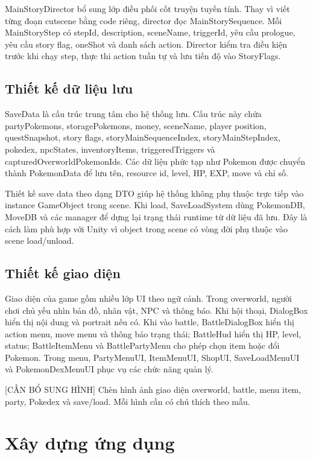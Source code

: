 MainStoryDirector bổ sung lớp điều phối cốt truyện tuyến tính. Thay vì viết từng đoạn cutscene bằng code riêng, director đọc MainStorySequence. Mỗi MainStoryStep có stepId, description, sceneName, triggerId, yêu cầu prologue, yêu cầu story flag, oneShot và danh sách action. Director kiểm tra điều kiện trước khi chạy step, thực thi action tuần tự và lưu tiến độ vào StoryFlags.

\subsection{Thiết kế dữ liệu lưu}

SaveData là cấu trúc trung tâm cho hệ thống lưu. Cấu trúc này chứa partyPokemons, storagePokemons, money, sceneName, player position, questSnapshot, story flags, storyMainSequenceIndex, storyMainStepIndex, pokedex, npcStates, inventoryItems, triggeredTriggers và capturedOverworldPokemonIds. Các dữ liệu phức tạp như Pokemon được chuyển thành PokemonData để lưu tên, resource id, level, HP, EXP, move và chỉ số.

Thiết kế save data theo dạng DTO giúp hệ thống không phụ thuộc trực tiếp vào instance GameObject trong scene. Khi load, SaveLoadSystem dùng PokemonDB, MoveDB và các manager để dựng lại trạng thái runtime từ dữ liệu đã lưu. Đây là cách làm phù hợp với Unity vì object trong scene có vòng đời phụ thuộc vào scene load/unload.

\subsection{Thiết kế giao diện}

Giao diện của game gồm nhiều lớp UI theo ngữ cảnh. Trong overworld, người chơi chủ yếu nhìn bản đồ, nhân vật, NPC và thông báo. Khi hội thoại, DialogBox hiển thị nội dung và portrait nếu có. Khi vào battle, BattleDialogBox hiển thị action menu, move menu và thông báo trạng thái; BattleHud hiển thị HP, level, status; BattleItemMenu và BattlePartyMenu cho phép chọn item hoặc đổi Pokemon. Trong menu, PartyMenuUI, ItemMenuUI, ShopUI, SaveLoadMenuUI và PokemonDexMenuUI phục vụ các chức năng quản lý.

[CẦN BỔ SUNG HÌNH] Chèn hình ảnh giao diện overworld, battle, menu item, party, Pokedex và save/load. Mỗi hình cần có chú thích theo mẫu.

\section{Xây dựng ứng dụng}

